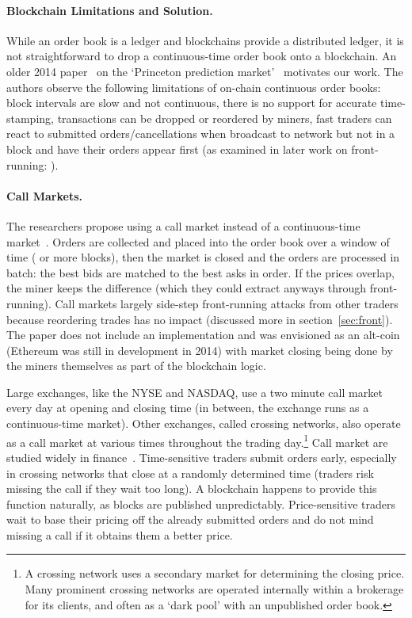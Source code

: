 \paragraph{Blockchain Limitations and Solution.} While an order book is a ledger and blockchains provide a distributed ledger, it is not straightforward to drop a continuous-time order book onto a blockchain. An older 2014 paper~\cite{clark2014decentralizing} on the `Princeton prediction market'~\cite{Bra13} motivates our work. The authors observe the following limitations of on-chain continuous order books: block intervals are slow and not continuous, there is no support for accurate time-stamping, transactions can be dropped or reordered by miners, fast traders can react to submitted orders/cancellations when broadcast to network but not in a block and have their orders appear first (as examined in later work on front-running: \cite{eskandari2019sok,daian2019flash}).

\paragraph{Call Markets.} The researchers propose using a call market instead of a continuous-time market~\cite{clark2014decentralizing}. Orders are collected and placed into the order book over a window of time ( or more blocks), then the market is closed and the orders are processed in batch: the best bids are matched to the best asks in order. If the prices overlap, the miner keeps the difference (which they could extract anyways through front-running). Call markets largely side-step front-running attacks from other traders because reordering trades has no impact (discussed more in section~\ref{sec:front}). The paper does not include an implementation and was envisioned as an alt-coin (Ethereum was still in development in 2014) with market closing being done by the miners themselves as part of the blockchain logic.

Large exchanges, like the NYSE and NASDAQ, use a two minute call market every day at opening and closing time (in between, the exchange runs as a continuous-time market). Other exchanges, called crossing networks, also operate as a call market at various times throughout the trading day.\footnote{A crossing network uses a secondary market for determining the closing price. Many prominent crossing networks are operated internally within a brokerage for its clients, and often as a `dark pool' with an unpublished order book.} Call market are studied widely in finance~\cite{Har03}. Time-sensitive traders submit orders early, especially in crossing networks that close at a randomly determined time (traders risk missing the call if they wait too long). A blockchain happens to provide this function naturally, as blocks are published unpredictably. Price-sensitive traders wait to base their pricing off the already submitted orders and do not mind missing a call if it obtains them a better price. 

